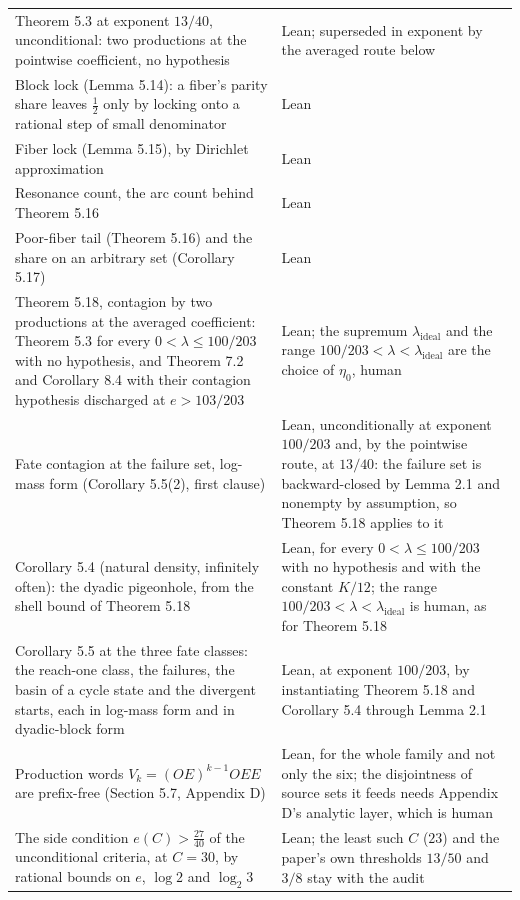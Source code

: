 \documentclass[11pt,a4paper]{article}
\begin{document}
\begin{longtable}[]{@{}
  >{\raggedright\arraybackslash}p{}
  >{\raggedright\arraybackslash}p{}@{}}
Theorem 5.3 at exponent \(13/40\), unconditional: two productions at the
pointwise coefficient, no hypothesis & Lean; superseded in exponent by
the averaged route below \\
Block lock (Lemma 5.14): a fiber's parity share leaves \(\tfrac12\) only
by locking onto a rational step of small denominator & Lean \\
Fiber lock (Lemma 5.15), by Dirichlet approximation & Lean \\
Resonance count, the arc count behind Theorem 5.16 & Lean \\
Poor-fiber tail (Theorem 5.16) and the share on an arbitrary set
(Corollary 5.17) & Lean \\
Theorem 5.18, contagion by two productions at the averaged coefficient:
Theorem 5.3 for every \(0<\lambda\le100/203\) with no hypothesis, and
Theorem 7.2 and Corollary 8.4 with their contagion hypothesis discharged
at \(e>103/203\) & Lean; the supremum \(\lambda_{\mathrm{ideal}}\) and
the range \(100/203<\lambda<\lambda_{\mathrm{ideal}}\) are the choice of
\(\eta_0\), human \\
Fate contagion at the failure set, log-mass form (Corollary 5.5(2),
first clause) & Lean, unconditionally at exponent \(100/203\) and, by
the pointwise route, at \(13/40\): the failure set is backward-closed by
Lemma 2.1 and nonempty by assumption, so Theorem 5.18 applies to it \\
Corollary 5.4 (natural density, infinitely often): the dyadic
pigeonhole, from the shell bound of Theorem 5.18 & Lean, for every
\(0<\lambda\le100/203\) with no hypothesis and with the constant
\(K/12\); the range \(100/203<\lambda<\lambda_{\mathrm{ideal}}\) is
human, as for Theorem 5.18 \\
Corollary 5.5 at the three fate classes: the reach-one class, the
failures, the basin of a cycle state and the divergent starts, each in
log-mass form and in dyadic-block form & Lean, at exponent \(100/203\),
by instantiating Theorem 5.18 and Corollary 5.4 through Lemma 2.1 \\
Production words \(V_k=(OE)^{k-1}OEE\) are prefix-free (Section 5.7,
Appendix D) & Lean, for the whole family and not only the six; the
disjointness of source sets it feeds needs Appendix D's analytic layer,
which is human \\
The side condition \(e(C)>\tfrac{27}{40}\) of the unconditional
criteria, at \(C=30\), by rational bounds on \(e\), \(\log 2\) and
\(\log_2 3\) & Lean; the least such \(C\) (\(23\)) and the paper's own
thresholds \(13/50\) and \(3/8\) stay with the audit \\

\end{longtable}
\end{document}
